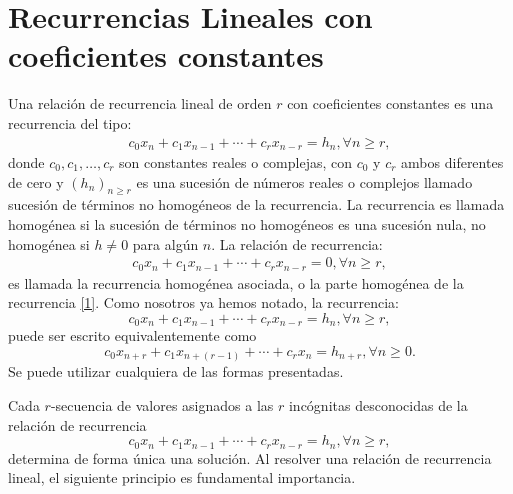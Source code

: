 \section{Recurrencias Lineales con coeficientes constantes}

Una relación de recurrencia lineal de orden $r$ con coeficientes constantes es una recurrencia del tipo:
\begin{align}\label{1}
c_{0}x_{n}+c_{1}x_{n-1}+\cdots+c_{r}x_{n-r}=h_{n},\forall n\geq r,
\end{align}
donde $c_{0},c_{1},\ldots,c_{r}$ son constantes reales o complejas, con $c_{0}$ y $c_{r}$ ambos diferentes de cero y $(h_{n})_{n\geq r}$ es una sucesión de números reales o complejos llamado sucesión de términos no homogéneos de la recurrencia. La recurrencia es llamada homogénea si la sucesión de términos no homogéneos es una sucesión nula, no homogénea si $h\neq0 $ para algún $n$. La relación de recurrencia:
\begin{align}\label{2}
c_{0}x_{n}+c_{1}x_{n-1}+\cdots+c_{r}x_{n-r}=0,\forall n\geq r,
\end{align}
es llamada la recurrencia homogénea asociada, o la parte homogénea de la recurrencia \eqref{1}. Como nosotros ya hemos notado, la recurrencia:
\begin{equation*}
c_{0}x_{n}+c_{1}x_{n-1}+\cdots+c_{r}x_{n-r}=h_{n},\forall n\geq r,
\end{equation*}
puede ser escrito equivalentemente como
\begin{equation*}
c_{0}x_{n+r}+c_{1}x_{n+(r-1)}+\cdots+c_{r}x_{n}=h_{n+r},\forall n\geq 0.
\end{equation*}
Se puede utilizar cualquiera de las formas presentadas.

\begin{remark}
	Cada $r$-secuencia de valores asignados a las $r$ incógnitas desconocidas de la relación de recurrencia
	\begin{equation*}
	c_{0}x_{n}+c_{1}x_{n-1}+\cdots+c_{r}x_{n-r}=h_{n},\forall n\geq r,
	\end{equation*}
	determina de forma única una solución. Al resolver una relación de recurrencia lineal, el siguiente principio es fundamental importancia.
\end{remark}


